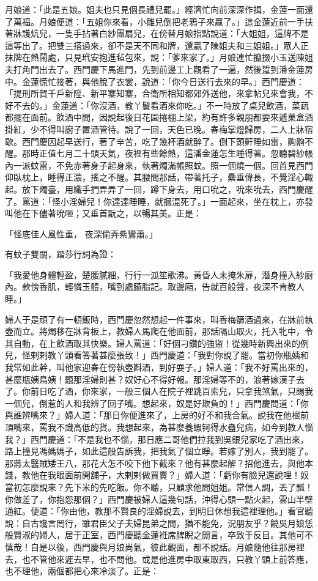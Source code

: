 月娘道：「此是五娘。姐夫也只見個長禮兒罷。」經濟忙向前深深作揖，金蓮一面還了萬福。月娘便道：「五姐你來看，小雛兒倒把老鴉子來贏了。」這金蓮近前一手扶著牀護炕兒，一隻手拈著白紗團扇兒，在傍替月娘指點說道：「大姐姐，這牌不是這等出了。把雙三搭過來，卻不是天不同和牌，還贏了陳姐夫和三姐姐。」眾人正抹牌在熱鬧處，只見玳安抱進毡包來，說：「爹來家了。」月娘連忙攛掇小玉送陳姐夫打角門出去了。西門慶下馬進門，先到前邊工上觀看了一遍，然後踅到潘金蓮房中。金蓮慌忙接著，與他脫了衣裳，說道：「你今日送行去來的早。」西門慶道：「提刑所賀千戶新陞、新平寨知寨，合衛所相知都郊外送他，來拿帖兒來會我，不好不去的。」金蓮道：「你沒酒，教丫鬟看酒來你吃。」不一時放了桌兒飲酒，菜蔬都擺在面前。飲酒中間，因說起後日花園捲棚上梁，約有許多親朋都要來遞菓盒酒掛紅，少不得叫廚子置酒管待。說了一回，天色已晚。春梅掌燈歸房，二人上牀宿歇。西門慶因起早送行，著了辛苦，吃了幾杯酒就醉了。倒下頭鼾睡如雷，齁齁不醒。那時正值七月二十頭天氣，夜裡有些餘熱，這潘金蓮怎生睡得著。忽聽碧紗帳內一派蚊雷，不免赤著身子起身來，執著燭滿帳照蚊。照一個燒一個。回首見西門仰臥枕上，睡得正濃，搖之不醒。其腰間那話，帶著托子，纍垂偉長，不覺淫心輙起。放下燭臺，用纖手捫弄弄了一回，蹲下身去，用口吮之，吮來吮去，西門慶醒了。罵道：「怪小淫婦兒！你達達睡睡，就摑混死了。」一面起來，坐在枕上，亦發叫他在下儘著吮咂；又垂首翫之，以暢其美。正是：

「怪底佳人風性重，  夜深偷弄紫鸞蕭。」

有蚊子雙關，踏莎行詞為證：

「我愛他身體輕盈，楚腰膩細，行行一泒笙歌沸。黃昏人未掩朱扉，潛身撞入紗廚內。款傍香肌，輕憐玉體，嘴到處臙脂記。取邊廂，告就百般聲，夜深不肯教人睡。」

婦人于是頑了有一頓飯時，西門慶忽然想起一件事來，叫香梅篩酒過來，在牀前執壺而立。將燭移在牀背板上，教婦人馬爬在他面前，那話隔山取火，托入牝中，令其自動，在上飲酒取其快樂。婦人罵道：「好個刁鑽的強盜！從幾時新興出來的例兒，怪剌剌教丫頭看答著甚麼張致！」西門慶道：「我對你說了罷。當初你瓶姨和我常如此幹，叫他家迎春在傍執壺斟酒，到好耍子。」婦人道：「我不好罵出來的，甚麼瓶姨鳥姨！題那淫婦則甚？奴好心不得好報。那淫婦等不的，浪著嫁漢子去了。你前日吃了酒，你來家，一般三個人在院子裡跳百索兒，只拿我煞氣，只踢我一個兒，倒惹的人和我辨了回子嘴。想起來，奴是好欺負的！」西門慶問道：「你與誰辨嘴來？」婦人道：「那日你便進來了，上房的好不和我合氣。說我在他根前頂嘴來，罵我不識高低的貨。我想起來，為甚麼養蝦钶得水蠱兒病，如今到教人惱我？」西門慶道：「不是我也不惱，那日應二哥他們拉我到吳銀兒家吃了酒出來，路上撞見馮媽媽子，如此這般告訴我，把我氣了個立睜。若嫁了別人，我到罷了。那蔣太醫賊矮王八，那花大怎不咬下他下截來？他有甚麼起解？招他進去，與他本錢，教他在我眼面前開舖子，大剌剌做買賣？」婦人道：「虧你有臉兒還說哩！奴當初怎麼說來？先下米的先吃飯。你不聽，只顧求他問姐姐。常信人調，丟了瓢！你做差了，你抱怨那個？」西門慶被婦人這幾句話，沖得心頭一點火起，雲山半壁通紅。便道：「你由他，教那不賢良的淫婦說去，到明日休想我這裡理他。」看官聽說：自古讒言罔行，雖君臣父子夫婦昆弟之間，猶不能免，況朋友乎？饒吳月娘恁般賢淑的婦人，居于正室，西門慶聽金蓮袵席脾睨之閒言，卒致于反目。其他可不慎哉！自是以後，西門慶與月娘尚氣，彼此觀面，都不說話。月娘隨他往那房裡去，也不管他來遲去早，也不問他。或是他進房中取東取西，只教丫頭上前答應，也不理他，兩個都把心來冷淡了。正是：

